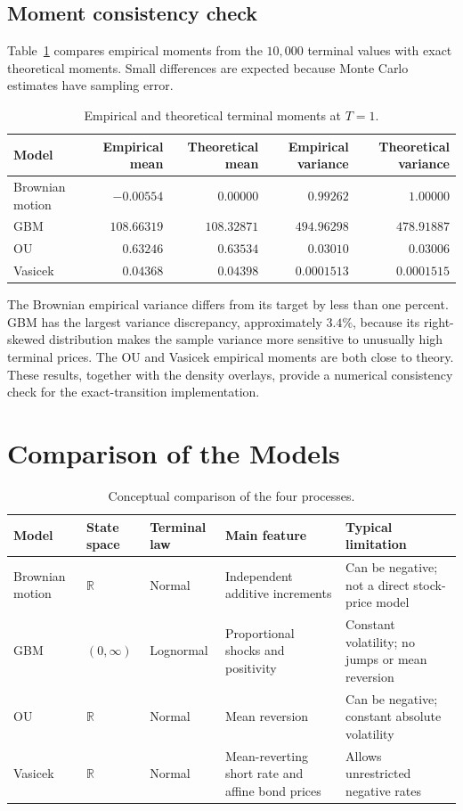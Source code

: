 \documentclass[11pt,a4paper]{article}
\begin{document}
\subsection{Moment consistency check}

Table~\ref{tab:diagnostics} compares empirical moments from the $10{,}000$ terminal values with exact theoretical moments. Small differences are expected because Monte Carlo estimates have sampling error.

\begin{table}[htbp]
\centering
\caption{Empirical and theoretical terminal moments at $T=1$.}
\label{tab:diagnostics}
\small
\begin{tabular}{lrrrr}
\toprule
Model & Empirical mean & Theoretical mean & Empirical variance & Theoretical variance\\
\midrule
Brownian motion & $-0.00554$ & $0.00000$ & $0.99262$ & $1.00000$\\
GBM & $108.66319$ & $108.32871$ & $494.96298$ & $478.91887$\\
OU & $0.63246$ & $0.63534$ & $0.03010$ & $0.03006$\\
Vasicek & $0.04368$ & $0.04398$ & $0.0001513$ & $0.0001515$\\
\bottomrule
\end{tabular}
\end{table}

The Brownian empirical variance differs from its target by less than one percent. GBM has the largest variance discrepancy, approximately $3.4\%$, because its right-skewed distribution makes the sample variance more sensitive to unusually high terminal prices. The OU and Vasicek empirical moments are both close to theory. These results, together with the density overlays, provide a numerical consistency check for the exact-transition implementation.

\section{Comparison of the Models}

\begin{table}[htbp]
\centering
\caption{Conceptual comparison of the four processes.}
\label{tab:comparison}
\begin{tabular}{p{2.6cm}p{2.4cm}p{2.4cm}p{3.0cm}p{3.0cm}}
\toprule
Model & State space & Terminal law & Main feature & Typical limitation\\
\midrule
Brownian motion & $\mathbb{R}$ & Normal & Independent additive increments & Can be negative; not a direct stock-price model\\
GBM & $(0,\infty)$ & Lognormal & Proportional shocks and positivity & Constant volatility; no jumps or mean reversion\\
OU & $\mathbb{R}$ & Normal & Mean reversion & Can be negative; constant absolute volatility\\
Vasicek & $\mathbb{R}$ & Normal & Mean-reverting short rate and affine bond prices & Allows unrestricted negative rates\\
\bottomrule
\end{tabular}
\end{table}
\end{document}
